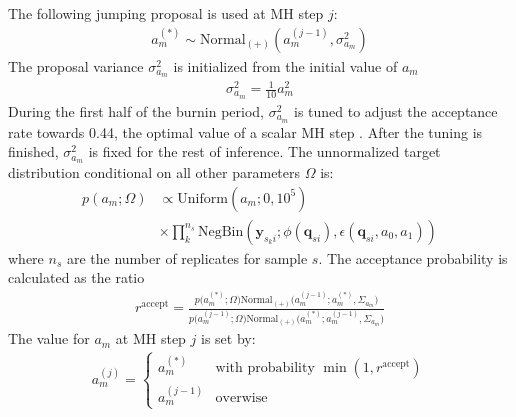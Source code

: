 \documentclass{article}
\newcommand{\Normaldist}{\text{Normal}}
\newcommand{\NegBindist}{\text{NegBin}}
\newcommand{\Uniformdist}{\text{Uniform}}
\newcommand{\qq}{\mathbf{q}}
\newcommand{\yy}{\mathbf{y}}
\begin{document}
\begin{appendices}
  The following jumping proposal is used at MH step $j$:
  \begin{align}
    a_m^{(*)} \sim \Normaldist_{(+)}(a_m^{(j-1)}, \sigma^2_{a_m})
  \end{align}
  The proposal variance $\sigma^2_{a_m}$ is initialized from the initial value of $a_m$
  \begin{align}
      \sigma^2_{a_m} = \frac{1}{10} a_m^2
  \end{align}
  During the first half of the burnin period, $\sigma^2_{a_m}$ is tuned to adjust the acceptance rate towards 0.44, the optimal value of a scalar MH step \cite{cite:BDA}. After the tuning is finished, $\sigma^2_{a_m}$ is fixed for the rest of inference.
  The unnormalized target distribution conditional on all other parameters $\Omega$ is:
  \begin{align}
    p(a_m ; \Omega) & \propto \Uniformdist(a_m ; 0, 10^5) \\
      & \times \prod_k^{n_{s}} \NegBindist(\yy_{s_k i}; \phi(\qq_{si}), \epsilon(\qq_{si}, a_0, a_1)) \nonumber
  \end{align}
  where $n_s$ are the number of replicates for sample $s$. The acceptance probability is calculated as the ratio
  \begin{align}
    r^{\text{accept}} = \frac{
      p \Big( a_m^{(*)} ; \Omega) \Normaldist_{(+)}(a_m^{(j-1)};a_m^{(*)},\Sigma_{a_m} \Big)}
    { p \Big( a_m^{(j-1)} ; \Omega) \Normaldist_{(+)}(a_m^{(*)};a_m^{(j-1)},\Sigma_{a_m} \Big)}
  \end{align}
  The value for $a_m$ at MH step $j$ is set by:
  \begin{align}
    a_m^{(j)} = \begin{cases}
      a_m^{(*)} & \text{with probability } \min(1, r^{\text{accept}}) \\
      a_m^{(j-1)} & \text{overwise}
  \end{cases}
  \end{align}

\end{appendices}
\end{document}
